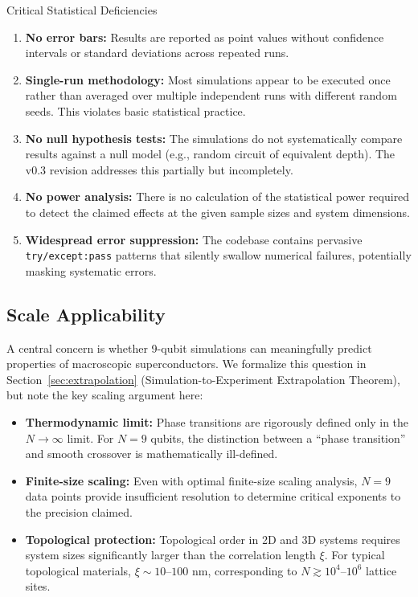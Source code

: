 \documentclass[11pt,a4paper]{article}
\begin{document}
\begin{critbox}{Critical Statistical Deficiencies}
\begin{enumerate}[leftmargin=1.5em]
  \item \textbf{No error bars:} Results are reported as point values without confidence intervals or standard deviations across repeated runs.
  
  \item \textbf{Single-run methodology:} Most simulations appear to be executed once rather than averaged over multiple independent runs with different random seeds. This violates basic statistical practice.
  
  \item \textbf{No null hypothesis tests:} The simulations do not systematically compare results against a null model (e.g., random circuit of equivalent depth). The v0.3 revision addresses this partially but incompletely.
  
  \item \textbf{No power analysis:} There is no calculation of the statistical power required to detect the claimed effects at the given sample sizes and system dimensions.
  
  \item \textbf{Widespread error suppression:} The codebase contains pervasive \texttt{try/except:pass} patterns that silently swallow numerical failures, potentially masking systematic errors.
\end{enumerate}
\end{critbox}

\subsection{Scale Applicability}

A central concern is whether 9-qubit simulations can meaningfully predict properties of macroscopic superconductors. We formalize this question in Section~\ref{sec:extrapolation} (Simulation-to-Experiment Extrapolation Theorem), but note the key scaling argument here:

\begin{itemize}[leftmargin=1.5em]
  \item \textbf{Thermodynamic limit:} Phase transitions are rigorously defined only in the $N \to \infty$ limit. For $N = 9$ qubits, the distinction between a ``phase transition'' and smooth crossover is mathematically ill-defined.
  \item \textbf{Finite-size scaling:} Even with optimal finite-size scaling analysis, $N = 9$ data points provide insufficient resolution to determine critical exponents to the precision claimed.
  \item \textbf{Topological protection:} Topological order in 2D and 3D systems requires system sizes significantly larger than the correlation length $\xi$. For typical topological materials, $\xi \sim 10$--$100$ nm, corresponding to $N \gtrsim 10^4$--$10^6$ lattice sites.
\end{itemize}
\end{document}
